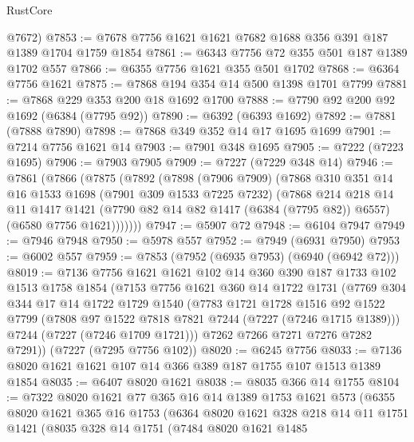 \begin{lexlean}{RustCore}
\begin{coremodule}
      @7672)
@7853 := @7678 @7756 @1621 @1621 @7682 @1688 @356 @391 @187 @1389 @1704 @1759 @1854
@7861 := @6343 @7756 @72 @355 @501 @187 @1389 @1702 @557
@7866 := @6355 @7756 @1621 @355 @501 @1702
@7868 := @6364 @7756 @1621
@7875 := @7868 @194 @354 @14 @500 @1398 @1701 @7799
@7881 := @7868 @229 @353 @200 @18 @1692 @1700
@7888 := @7790 @92 @200 @92 @1692 (@6384 (@7795 @92))
@7890 := @6392 (@6393 @1692)
@7892 := @7881 (@7888 @7890)
@7898 := @7868 @349 @352 @14 @17 @1695 @1699
@7901 := @7214 @7756 @1621 @14
@7903 := @7901 @348 @1695
@7905 := @7222 (@7223 @1695)
@7906 := @7903 @7905
@7909 := @7227 (@7229 @348 @14)
@7946 := @7861
    (@7866
      (@7875
        (@7892
          (@7898
            (@7906 @7909)
            (@7868
              @310
              @351
              @14
              @16
              @1533
              @1698
              (@7901 @309 @1533 @7225 @7232)
              (@7868
                @214
                @218
                @14
                @11
                @1417
                @1421
                (@7790 @82 @14 @82 @1417 (@6384 (@7795 @82)) @6557)
                (@6580 @7756 @1621)))))))
@7947 := @5907 @72
@7948 := @6104 @7947
@7949 := @7946 @7948
@7950 := @5978 @557
@7952 := @7949 (@6931 @7950)
@7953 := @6002 @557
@7959 := @7853 (@7952 (@6935 @7953) (@6940 (@6942 @72)))
@8019 := @7136
    @7756
    @1621
    @1621
    @102
    @14
    @360
    @390
    @187
    @1733
    @102
    @1513
    @1758
    @1854
    (@7153
      @7756
      @1621
      @360
      @14
      @1722
      @1731
      (@7769
        @304
        @344
        @17
        @14
        @1722
        @1729
        @1540
        (@7783
          @1721
          @1728
          @1516
          @92
          @1522
          @7799
          (@7808 @97 @1522 @7818 @7821 @7244 (@7227 (@7246 @1715 @1389)))
          @7244
          (@7227 (@7246 @1709 @1721)))
        @7262
        @7266
        @7271
        @7276
        @7282
        @7291))
    (@7227 (@7295 @7756 @102))
@8020 := @6245 @7756
@8033 := @7136 @8020 @1621 @1621 @107 @14 @366 @389 @187 @1755 @107 @1513 @1389 @1854
@8035 := @6407 @8020 @1621
@8038 := @8035 @366 @14 @1755
@8104 := @7322
    @8020
    @1621
    @77
    @365
    @16
    @14
    @1389
    @1753
    @1621
    @573
    (@6355
      @8020
      @1621
      @365
      @16
      @1753
      (@6364
        @8020
        @1621
        @328
        @218
        @14
        @11
        @1751
        @1421
        (@8035
          @328
          @14
          @1751
          (@7484
            @8020
            @1621
            @1485

\end{coremodule}
\end{lexlean}
